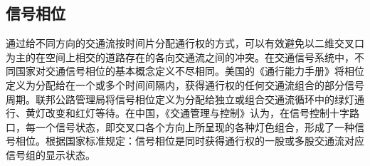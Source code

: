 \subsection{信号相位}
通过给不同方向的交通流按时间片分配通行权的方式，可以有效避免以二维交叉口为主的在空间上相交的道路存在的各向交通流之间的冲突。在交通信号系统中，不同国家对交通信号相位的基本概念定义不尽相同。美国的《通行能力手册》\cite{2000Highway}将相位定义为分配给在一个或多个时间间隔内，获得通行权的任何交通流组合的部分信号周期。联邦公路管理局将信号相位定义为分配给独立或组合交通流循环中的绿灯通行、黄灯改变和红灯等待。在中国，《交通管理与控制》\cite{yangpeikun2003}认为，在信号控制十字路口，每一个信号状态，即交叉口各个方向上所呈现的各种灯色组合，形成了一种信号相位。根据国家标准\cite{GB_T_31418}规定：信号相位是同时获得通行权的一股或多股交通流对应信号组的显示状态。






